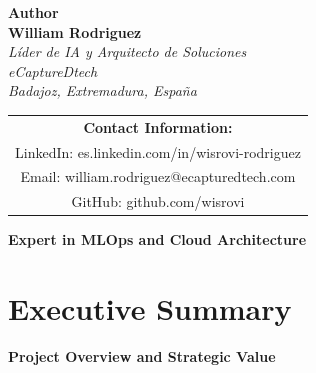 \documentclass[12pt,a4paper]{report}
\begin{document}
\begin{titlepage}
    \centering
    \vspace*{3cm}
    
    \begin{center}
        {\color{primarycolor}\Large\textbf{Author}}\\[1cm]
        
        {\Large\textbf{William Rodriguez}}\\[0.5cm]
        
        \textit{Líder de IA y Arquitecto de Soluciones}\\[0.3cm]
        \textit{eCaptureDtech}\\[0.2cm]
        \textit{Badajoz, Extremadura, España}\\[1cm]
        
        \begin{tabular}{c}
            \textbf{Contact Information:}\\[0.5cm]
            LinkedIn: es.linkedin.com/in/wisrovi-rodriguez\\[0.2cm]
            Email: william.rodriguez@ecapturedtech.com\\[0.2cm]
            GitHub: github.com/wisrovi
        \end{tabular}
    \end{center}
    
    \vfill
    
    \begin{center}
        \colorbox{secondarycolor}{
            \color{white}\textbf{Expert in MLOps and Cloud Architecture}
        }
    \end{center}
\end{titlepage}

\tableofcontents
\cleardoublepage

\listoffigures
\cleardoublepage

\listoftables
\cleardoublepage

\lstlistoflistings
\cleardoublepage

\chapter{Executive Summary}
\label{chap:executive}

\begin{center}
\textbf{Project Overview and Strategic Value}
\end{center}
\end{document}

